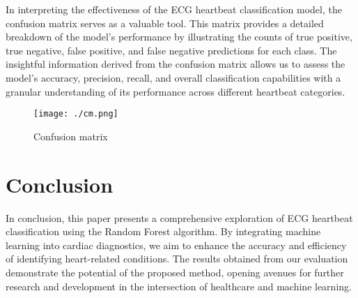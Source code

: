 \documentclass[conference]{IEEEtran}
\begin{document}
In interpreting the effectiveness of the  ECG heartbeat classification model, the confusion matrix serves as a valuable tool. This matrix provides a detailed breakdown of the model's performance by illustrating the counts of true positive, true negative, false positive, and false negative predictions for each class. The insightful information derived from the confusion matrix allows us to assess the model's accuracy, precision, recall, and overall classification capabilities with a granular understanding of its performance across different heartbeat categories.

\begin{figure}[h]
    \centering
    \begin{minipage}{0.45\textwidth}
        \centering
        \texttt{[image: ./cm.png]}
        \caption{Confusion matrix}
        \label{fig:Confusion matrix}
    \end{minipage}\hfill
\end{figure}

\section{Conclusion}

In conclusion, this paper presents a comprehensive exploration of ECG heartbeat classification using the Random Forest algorithm. By integrating machine learning into cardiac diagnostics, we aim to enhance the accuracy and efficiency of identifying heart-related conditions. The results obtained from our evaluation demonstrate the potential of the proposed method, opening avenues for further research and development in the intersection of healthcare and machine learning.
\end{document}
